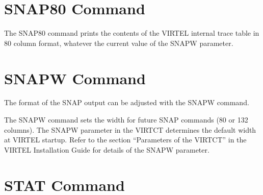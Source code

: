 \documentclass[letterpaper,10pt,english]{sphinxmanual}
\begin{document}
\section{SNAP80 Command}
\label{\detokenize{audit_operations_ and_performance:snap80-command}}\label{\detokenize{audit_operations_ and_performance:index-21}}
\begin{sphinxVerbatim}[commandchars=\\\{\}]
\end{sphinxVerbatim}

\sphinxAtStartPar
The SNAP80 command prints the contents of the VIRTEL internal trace table in 80 column format, whatever the current value of the SNAPW parameter.

\ignorespaces 

\section{SNAPW Command}
\label{\detokenize{audit_operations_ and_performance:snapw-command}}\label{\detokenize{audit_operations_ and_performance:index-22}}
\sphinxAtStartPar
The format of the SNAP output can be adjusted with the SNAPW command.

\begin{sphinxVerbatim}[commandchars=\\\{\}]
  
\end{sphinxVerbatim}

\sphinxAtStartPar
The SNAPW command sets the width for future SNAP commands (80 or 132 columns). The SNAPW parameter in the VIRTCT determines the default width at VIRTEL startup. Refer to the section “Parameters of the VIRTCT” in the VIRTEL Installation Guide for details of the SNAPW parameter.

\ignorespaces 

\section{STAT Command}
\label{\detokenize{audit_operations_ and_performance:stat-command}}\label{\detokenize{audit_operations_ and_performance:index-23}}
\end{document}
